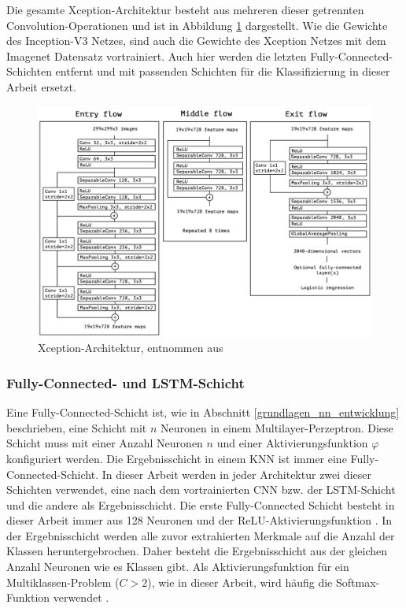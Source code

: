 Die gesamte Xception-Architektur besteht aus mehreren dieser getrennten Convolution-Operationen und ist in Abbildung \ref{fig_xception} dargestellt. Wie die Gewichte des Inception-V3 Netzes, sind auch die Gewichte des Xception Netzes mit dem Imagenet Datensatz vortrainiert. Auch hier werden die letzten Fully-Connected-Schichten entfernt und mit passenden Schichten für die Klassifizierung in dieser Arbeit ersetzt.

\begin{figure}[h]
\centering
\includegraphics[scale=0.35]{images/xception.png}
\caption[Xception-Architektur]{Xception-Architektur, entnommen aus \cite{chollet2017xception}}
\label{fig_xception}
\end{figure}

\subsubsection{Fully-Connected- und \ac{LSTM}-Schicht}

Eine Fully-Connected-Schicht ist, wie in Abschnitt \ref{grundlagen_nn_entwicklung} beschrieben, eine Schicht mit $n$ Neuronen in einem Multilayer-Perzeptron. Diese Schicht muss mit einer Anzahl Neuronen $n$ und einer Aktivierungsfunktion $\varphi$ konfiguriert werden. Die Ergebnisschicht in einem \ac{KNN} ist immer eine Fully-Connected-Schicht. In dieser Arbeit werden in jeder Architektur zwei dieser Schichten verwendet, eine nach dem vortrainierten \ac{CNN} bzw. der \ac{LSTM}-Schicht und die andere als Ergebnisschicht. Die erste Fully-Connected Schicht besteht in dieser Arbeit immer aus 128 Neuronen und der \ac{ReLU}-Aktivierungsfunktion \cite{nair2010rectified}. In der Ergebnisschicht werden alle zuvor extrahierten Merkmale auf die Anzahl der Klassen heruntergebrochen. Daher besteht die Ergebnisschicht aus der gleichen Anzahl Neuronen wie es Klassen gibt. Als Aktivierungsfunktion für ein Multiklassen-Problem ($C>2$), wie in dieser Arbeit, wird häufig die Softmax-Funktion verwendet \cite{bishop2006pattern}.

